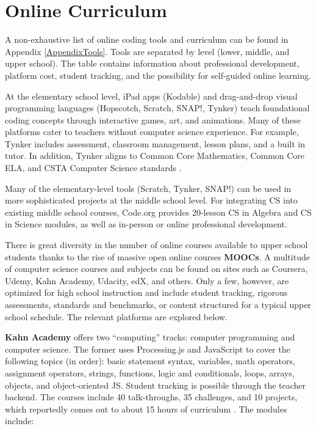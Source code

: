 \section{Online Curriculum}
A non-exhaustive list of online coding tools and curriculum can be found in Appendix \ref{AppendixTools}. Tools are separated by level (lower, middle, and upper school). The table contains information about professional development, platform cost, student tracking, and the possibility for self-guided online learning. \par 
At the elementary school level, iPad apps (Kodable) and drag-and-drop visual programming languages (Hopscotch, Scratch, SNAP!, Tynker) teach foundational coding concepts through interactive games, art, and animations. Many of these platforms cater to teachers without computer science experience. For example, Tynker includes assessment, classroom management, lesson plans, and a built in tutor. In addition, Tynker aligns to Common Core Mathematics, Common Core ELA, and CSTA Computer Science standards \cite{tynker}. \par
Many of the elementary-level tools (Scratch, Tynker, SNAP!) can be used in more sophisticated projects at the middle school level. For integrating CS into existing middle school courses, Code.org provides 20-lesson CS in Algebra and CS in Science modules, as well as in-person or online professional development. \par
There is great diversity in the number of online courses available to upper school students thanks to the rise of massive open online courses \textbf{MOOCs}. A multitude of computer science courses and subjects can be found on sites such as Coursera, Udemy, Kahn Academy, Udacity, edX, and others. Only a few, however, are optimized for high school instruction and include student tracking, rigorous assessments, standards and benchmarks, or content structured for a typical upper school schedule. The relevant platforms are explored below. \par
\textbf{Kahn Academy} offers two ``computing'' tracks: computer programming and computer science. The former uses Processing.js and JavaScript to cover the following topics (in order): basic statement syntax, variables, math operators, assignment operators, strings, functions, logic and conditionals, loops, arrays, objects, and object-oriented JS. Student tracking is possible through the teacher backend. The courses include 40 talk-throughs, 35 challenges, and 10 projects, which reportedly comes out to about 15 hours of curriculum \cite{kahnresource}.  The modules include:

